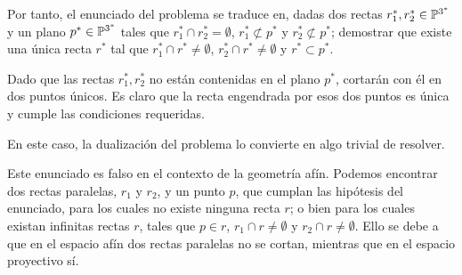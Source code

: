 \begin{exa}
\begin{enumerate}
		Por tanto, el enunciado del problema se traduce en, dadas dos rectas $r_1^*, r_2^*\in\mathbb{P}^{3^*}$ y un plano $p^*\in\mathbb{P}^{3^*}$ tales que $r_1^*\cap r_2^*=\emptyset$, $r_1^*\not\subset p^*$ y $r_2^*\not\subset p^*$; demostrar que existe una única recta $r^*$ tal que $r_1^*\cap r^*\not=\emptyset$, $r_2^*\cap r^*\not=\emptyset$ y $r^*\subset p^*$.
		
		Dado que las rectas $r_1^*, r_2^*$ no están contenidas en el plano $p^*$, cortarán con él en dos puntos únicos. Es claro que la recta engendrada por esos dos puntos es única y cumple las condiciones requeridas.
	\end{enumerate}
	En este caso, la dualización del problema lo convierte en algo trivial de resolver.
\end{exa}
\begin{obs}
	Este enunciado es falso en el contexto de la geometría afín. Podemos encontrar dos rectas paralelas, $r_1$ y $r_2$, y un punto $p$, que cumplan las hipótesis del enunciado, para los cuales no existe ninguna recta $r$; o bien para los cuales existan infinitas rectas $r$, tales que $p\in r$, $r_1\cap r\not=\emptyset$ y $r_2\cap r\not=\emptyset$. Ello se debe a que en el espacio afín dos rectas paralelas no se cortan, mientras que en el espacio proyectivo sí.
\end{obs}
